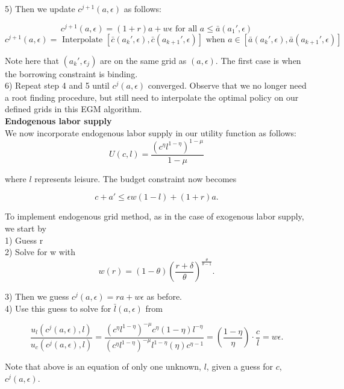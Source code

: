 \documentclass{article}
\begin{document}
	5) Then we update $c^{j+1}(a,\epsilon)$ as follows:
		
		$$c^{j+1}(a,\epsilon) = (1+r)a + w \epsilon  \text{ for all } a \leq \bar{a}(a_{1}', \epsilon)$$
		$$c^{j+1}(a,\epsilon) = \text{ Interpolate } [\bar{c}(a_{k}', \epsilon), \bar{c}(a_{k+1}', \epsilon)] \text{ when } a \in [\bar{a}(a_{k}', \epsilon), \bar{a}(a_{k+1}', \epsilon)]$$
		
		Note here that $(a_{k}', \epsilon_{j})$ are on the same grid as $(a,\epsilon)$. The first case is when the borrowing constraint is binding.  \\
		
	6) Repeat step 4 and 5 until $c^{j}(a,\epsilon)$ converged. Observe that we no longer need a root finding procedure, but still need to interpolate the optimal policy on our defined grids in this EGM algorithm. \\
		
	 
	
	\noindent\textbf{\Large Endogenous labor supply} \\
	
		We now incorporate endogenous labor supply in our utility function as follows:
		$$U(c,l) =  \frac{(c^\eta l^{1-\eta})^{1-\mu}}{1-\mu}$$
		
		where $l$ represents leisure. The budget constraint now becomes
		
		$$c+a' \leq \epsilon w (1 - l) + (1 + r)a.$$
		
		To implement endogenous grid method, as in the case of exogenous labor supply, we start by \\ 
		
		1) Guess r \\
		
		2) Solve for w with \\
		
		$$w(r) = (1-\theta)\left(\frac{r+\delta}{\theta}\right)^{\frac{\theta}{\theta-1}}. $$
		
		3) Then we guess $c^{j}(a,\epsilon) = ra + w\epsilon$ as before. \\
		
		4) Use this guess to solve for $\bar{l}(a, \epsilon)$ from
		
		$$\frac{u_{l}(c^{j}(a,\epsilon),l)}{u_{c}(c^{j}(a,\epsilon),l)} = \frac{(c^\eta l^{1-\eta})^{-\mu}c^{\eta}(1-\eta)l^{-\eta} }{(c^\eta l^{1-\eta})^{-\mu}l^{1-\eta}(\eta) c^{\eta-1}} = (\frac{1-\eta}{\eta}) \cdot \frac{c}{l} = w\epsilon.$$
		
		Note that above is an equation of only one unknown, $l$, given a guess for $c$, $c^{j}(a,\epsilon)$. \\
		
\end{document}
